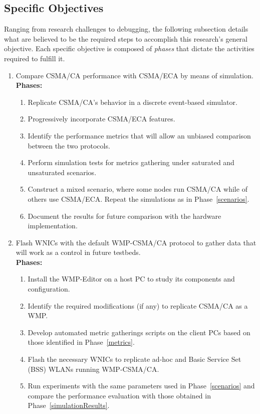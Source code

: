 \subsection{Specific Objectives}
Ranging from research challenges to debugging, the following subsection details what are believed to be the required steps to accomplish this research's general objective. Each specific objective is composed of \emph{phases} that dictate the activities required to fulfill it.
\begin{enumerate}
	\item Compare CSMA/CA performance with CSMA/ECA by means of simulation.\\
	
	{\bfseries Phases:}
	\begin{enumerate}
		\item Replicate CSMA/CA's behavior in a discrete event-based simulator.\label{buildSimulator}
		\item Progressively incorporate CSMA/ECA features.\label{incorporateECA}
		\item Identify the performance metrics that will allow an unbiased comparison between the two protocols.\label{metrics}
		\item Perform simulation tests for metrics gathering under saturated and unsaturated scenarios\label{scenarios}.
		\item Construct a mixed scenario, where some nodes run CSMA/CA while of others use CSMA/ECA. Repeat the simulations as in Phase~\ref{scenarios}.
		\item Document the results for future comparison with the hardware implementation.\label{simulationResults}\\
	\end{enumerate}
	
	\item Flash WNICs with the default WMP-CSMA/CA protocol to gather data that will work as a control in future testbeds.\label{learningWMP}\\
	
	{\bfseries Phases:}
	\begin{enumerate}
		\item Install the WMP-Editor on a host PC to study its components and configuration.
		\item Identify the required modifications (if any) to replicate CSMA/CA as a WMP.
		\item Develop automated metric gatherings scripts on the client PCs based on those identified in Phase~\ref{metrics}.
		\item Flash the necessary WNICs to replicate ad-hoc and Basic Service Set (BSS) WLANs running WMP-CSMA/CA.
		\item Run experiments with the same parameters used in Phase~\ref{scenarios} and compare the performance evaluation with those obtained in Phase~\ref{simulationResults}.\label{WMPExperiment}\\
	\end{enumerate}


\end{enumerate}
